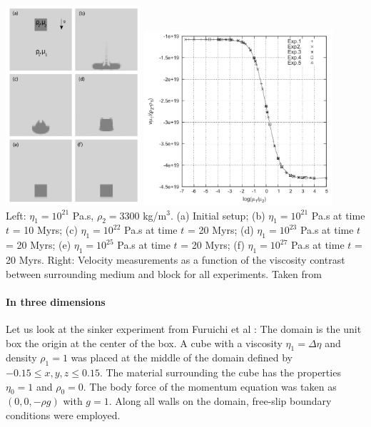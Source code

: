 \begin{center}
\includegraphics[width=5cm]{images/benchmark_sinker/thie11a}
\includegraphics[width=7cm]{images/benchmark_sinker/thie11b}\\
{\scriptsize Left: 
$\eta_1 = 10^{21}$ Pa.s, $\rho_2= 3300$ kg/m$^3$. 
(a) Initial setup; 
(b) $\eta_1 = 10^{21}$ Pa.s at time $t$ = 10 Myrs; 
(c) $\eta_1 = 10^{22}$ Pa.s at time $t$ = 20 Myrs; 
(d) $\eta_1 = 10^{23}$ Pa.s at time $t$ = 20 Myrs; 
(e) $\eta_1 = 10^{25}$ Pa.s at time $t$ = 20 Myrs; 
(f) $\eta_1 = 10^{27}$ Pa.s at time $t$ = 20 Myrs. 
Right: Velocity measurements as a function of the viscosity contrast between
surrounding medium and block for all experiments.
Taken from \cite{thie11}}
\end{center}

\paragraph{In three dimensions}
Let us look at the sinker experiment from Furuichi et al \cite{fumt11}: 
The domain is the unit box the origin at the center of the box. A cube with a viscosity $\eta_1=\Delta \eta$ 
and density $\rho_1 = 1$ was placed at the middle of the domain defined by
$-0.15 \leq x,y,z \leq 0.15$.
The material surrounding the cube has the properties $\eta_0=1$ and $\rho_0 = 0$. 
The body force of the momentum equation was taken as $(0, 0,-\rho g)$ with $g = 1$.
Along all walls on the domain, free-slip boundary conditions were employed.

